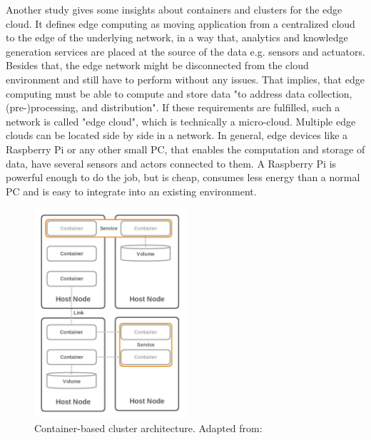 Another study \autocite{Pahl:2015} gives some insights about containers and clusters for the edge cloud.
It defines edge computing as moving application from a centralized cloud to the edge of the underlying network, in a way that, analytics and knowledge generation services are placed at the source of the data e.g. sensors and actuators.\autocite[cf.][p. 380]{Pahl:2015}
Besides that, the edge network might be disconnected from the cloud environment and still have to perform without any issues.
That implies, that edge computing must be able to compute and store data "to address data collection, (pre-)processing, and distribution"\autocite[p. 380]{Pahl:2015}.
If these requirements are fulfilled, such a network is called "edge cloud", which is technically a micro-cloud.\autocite[cf.][p. 121]{Pahl:2016}
Multiple edge clouds can be located side by side in a network.
In general, edge devices like a Raspberry Pi or any other small \ac{PC}, that enables the computation and storage of data, have several sensors and actors connected to them.
A Raspberry Pi is powerful enough to do the job, but is cheap, consumes less energy than a normal \ac{PC} and is easy to integrate into an existing environment.\autocite[cf.][p. 118]{Pahl:2016}

\begin{figure}[H]
    \centering
    \includegraphics[width=0.5\textwidth]{resources/images/container_based_cluster_architecture.png}
    \caption[Container-based cluster architecture]{Container-based cluster architecture. Adapted from: \autocite[p. 384]{Pahl:2015}}
    \label{fig:container_based_cluster_architecture}
\end{figure}

